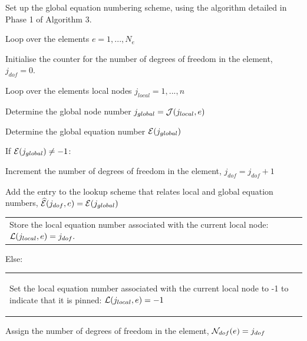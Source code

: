 \begin{DoxyItemize}
\item Set up the global equation numbering scheme, using the algorithm detailed in Phase 1 of Algorithm 3.
\item Loop over the elements $ e=1,...,N_e $
\begin{DoxyItemize}
\item Initialise the counter for the number of degrees of freedom in the element, $ j_{dof}=0 $.
\item Loop over the element\textquotesingle{}s local nodes $ j_{local}=1,...,n$
\begin{DoxyItemize}
\item Determine the global node number $ j_{global} = {\cal J}(j_{local},e) $
\item Determine the global equation number ${\cal E}(j_{global})$
\item If ${\cal E}(j_{global}) \ne -1$\+:
\begin{DoxyItemize}
\item Increment the number of degrees of freedom in the element, $ j_{dof}=j_{dof}+1$
\item Add the entry to the lookup scheme that relates local and global equation numbers, $ \widehat{\cal E}(j_{dof},e) = {\cal E}(j_{global})$
\item \tabulinesep=1mm
\begin{longtabu} spread 0pt [c]{*{1}{|X[-1]}|}
\hline
Store the local equation number associated with the current local node\+: $ {\cal L}(j_{local},e)=j_{dof}.$   \\
\end{longtabu}

\end{DoxyItemize}
\item Else\+: \tabulinesep=1mm
\begin{longtabu} spread 0pt [c]{*{1}{|X[-1]}|}
\hline

\begin{DoxyItemize}
\item Set the local equation number associated with the current local node to -\/1 to indicate that it is pinned\+: $ {\cal L}(j_{local},e)=-1$   
\end{DoxyItemize}\\
\end{longtabu}

\end{DoxyItemize}
\item Assign the number of degrees of freedom in the element, $ {\cal N}_{dof}(e)=j_{dof} $
\end{DoxyItemize}
\end{DoxyItemize}

